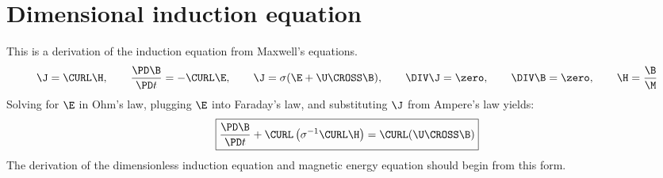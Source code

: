 \documentclass[11pt]{article}
\begin{document}
\doublespacing
\MOONSTITLE
\maketitle

\section{Dimensional induction equation}
This is a derivation of the induction equation from Maxwell's equations.
\begin{equation}\begin{aligned}
	\J = \CURL \H, \qquad
	\frac{\PD \B}{\PD t} = - \CURL \E, \qquad
	\J = \sigma (\E + \U \CROSS \B), \qquad
	\DIV \J = \zero, \qquad
	\DIV \B = \zero, \qquad \H = \frac{\B}{\M}
\end{aligned}\end{equation}
Solving for $\E$ in Ohm's law, plugging $\E$ into Faraday's law, and substituting $\J$ from Ampere's law yields:
\begin{equation}
	\boxed{
	\frac{\PD \B}{\PD t} + \CURL \left( \sigma^{-1}\CURL \H \right)
	= \CURL (\U \CROSS \B)
	}
\end{equation}
The derivation of the dimensionless induction equation and magnetic energy equation should begin from this form.
\end{document}
